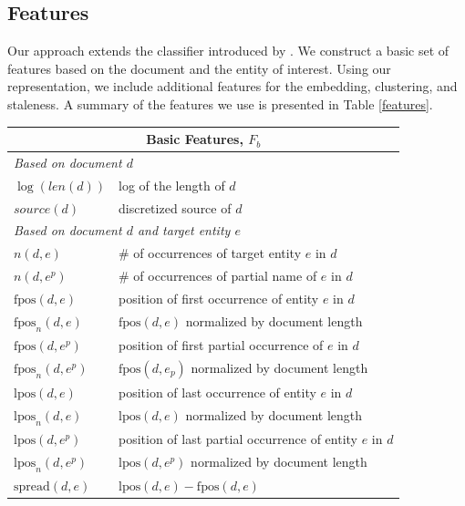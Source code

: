 \documentclass{article}
\begin{document}
\subsection{Features}
\label{feat}

Our approach extends the classifier introduced by \citet{jingang13}.
We construct a basic set of features based on the document and the entity of interest.
Using our representation, we include additional features for the embedding, clustering, and staleness.
A summary of the features we use is presented in Table \ref{features}. 


\begin{table}[tb]
\center
{\small
\begin{tabular}{p{}p{}}
\toprule
\multicolumn{2}{c}{\textbf{Basic Features, $F_b$}} \\ %
\midrule
\multicolumn{2}{l}{\emph{Based on document $d$}} \\ %
$\log(len(d))$ & log of the length of $d$ \\ %
$source(d)$ & discretized source of $d$ \\
\multicolumn{2}{l}{\emph{Based on document $d$ and target entity $e$}} \\ %
$n(d,e)$ & \# of occurrences of target entity $e$ in $d$ \\
$n(d,e^p)$ & \# of occurrences of partial name of $e$ in $d$ \\
$\text{fpos}(d,e)$ & position of first occurrence of entity $e$ in $d$ \\
$\text{fpos}_n(d,e)$ & $\text{fpos}(d,e)$ normalized by document length \\
$\text{fpos}(d,e^p)$ & position of first partial occurrence of $e$ in $d$ \\
$\text{fpos}_n(d,e^p)$ & $\text{fpos}(d,e_p)$ normalized by document length \\
$\text{lpos}(d,e)$ & position of last occurrence of entity $e$ in $d$ \\
$\text{lpos}_n(d,e)$ & $\text{lpos}(d,e)$ normalized by document length \\
$\text{lpos}(d,e^p)$ & position of last partial occurrence of entity $e$ in $d$ \\
$\text{lpos}_n(d,e^p)$ & $\text{lpos}(d,e^p)$ normalized by document length \\ 
$\text{spread}(d,e)$ & $\text{lpos}(d,e) - \text{fpos}(d,e)$ \\

\end{tabular}}
\end{table}
\end{document}
